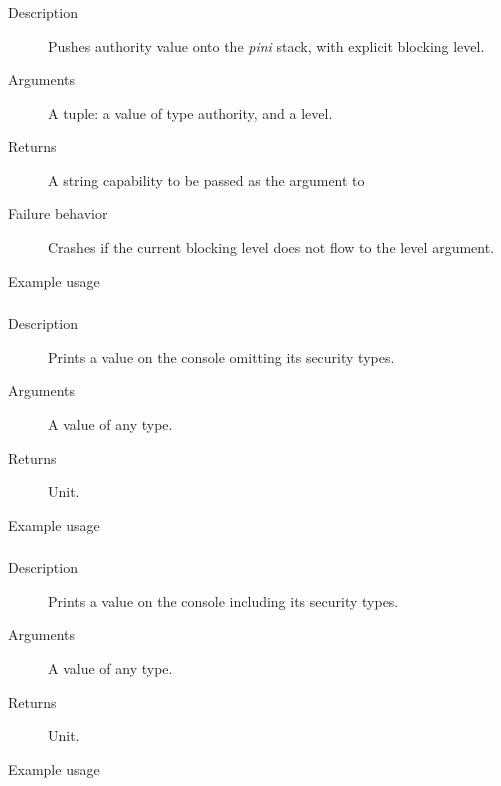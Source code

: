 \subsubsection{}
\begin{description}
    \item [Description] Pushes authority value onto the \emph{pini} stack,
	 with explicit blocking level. 
    \item [Arguments] A tuple: a value of type authority, and a level.
    \item [Returns] A string capability to be passed as the argument to 
    \item [Failure behavior] Crashes if the current blocking level does not flow to the level argument.
    \item [Example usage] 
\end{description}


\subsubsection{}
\begin{description}
    \item [Description] Prints a value on the console omitting its security types.
    \item [Arguments] A value of any type.
    \item [Returns] Unit.
    \item [Example usage] 
\end{description}


\subsubsection{}
\begin{description}
    \item [Description] Prints a value on the console including its security types.
    \item [Arguments] A value of any type.
    \item [Returns] Unit.
    \item [Example usage] 
\end{description}


